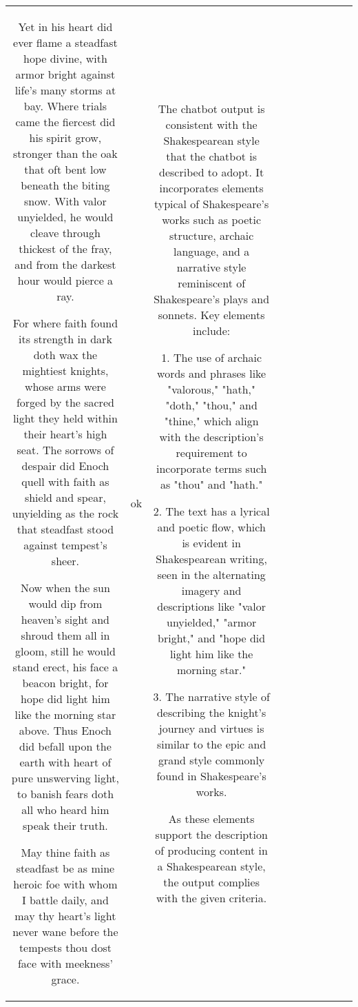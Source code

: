 \begin{table}[h!]
\begin{tabular}{|c|c|c|c|c|c|c|c|c|c|}
Yet in his heart did ever flame a steadfast hope divine, with armor bright against life's many storms at bay. Where trials came the fiercest did his spirit grow, stronger than the oak that oft bent low beneath the biting snow. With valor unyielded, he would cleave through thickest of the fray, and from the darkest hour would pierce a ray.

For where faith found its strength in dark doth wax the mightiest knights, whose arms were forged by the sacred light they held within their heart's high seat. The sorrows of despair did Enoch quell with faith as shield and spear, unyielding as the rock that steadfast stood against tempest's sheer.

Now when the sun would dip from heaven's sight and shroud them all in gloom, still he would stand erect, his face a beacon bright, for hope did light him like the morning star above. Thus Enoch did befall upon the earth with heart of pure unswerving light, to banish fears doth all who heard him speak their truth.

May thine faith as steadfast be as mine heroic foe with whom I battle daily, and may thy heart's light never wane before the tempests thou dost face with meekness' grace. & ok & The chatbot output is consistent with the Shakespearean style that the chatbot is described to adopt. It incorporates elements typical of Shakespeare's works such as poetic structure, archaic language, and a narrative style reminiscent of Shakespeare's plays and sonnets. Key elements include:

1. The use of archaic words and phrases like "valorous," "hath," "doth," "thou," and "thine," which align with the description's requirement to incorporate terms such as "thou" and "hath."

2. The text has a lyrical and poetic flow, which is evident in Shakespearean writing, seen in the alternating imagery and descriptions like "valor unyielded," "armor bright," and "hope did light him like the morning star."

3. The narrative style of describing the knight's journey and virtues is similar to the epic and grand style commonly found in Shakespeare's works.

As these elements support the description of producing content in a Shakespearean style, the output complies with the given criteria.


\end{tabular}
\end{table}
